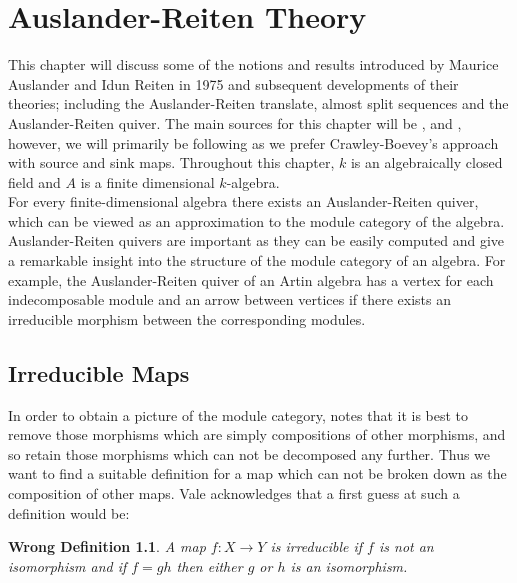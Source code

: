 \documentclass[11.5pt, twoside, a4paper, titlepage]{report}
\theoremstyle{definition}
\theoremstyle{plain}
\newtheorem*{wrong}{Wrong Definition}
\begin{document}


\chapter{Auslander-Reiten Theory}
This chapter will discuss some of the notions and results introduced by Maurice Auslander and Idun Reiten in 1975 and subsequent developments of their theories; including the Auslander-Reiten translate, almost split sequences and the Auslander-Reiten quiver. The main sources for this chapter will be \cite{CB3}, \cite{Vale} and \cite{Assem}, however, we will primarily be following \cite{CB3} as we prefer Crawley-Boevey's approach with source and sink maps. Throughout this chapter, $k$ is an algebraically closed field and $A$ is a finite dimensional $k$-algebra.\\
For every finite-dimensional algebra there exists an Auslander-Reiten quiver, which can be viewed as an approximation to the module category of the algebra. Auslander-Reiten quivers are important as they can be easily computed and give a remarkable insight into the structure of the module category of an algebra. For example, the Auslander-Reiten quiver of an Artin algebra has a vertex for each indecomposable module and an arrow between vertices if there exists an irreducible morphism between the corresponding modules. \cite{AR}

\section{Irreducible Maps}
In order to obtain a picture of the module category, \cite{Vale} notes that it is best to remove those morphisms which are simply compositions of other morphisms, and so retain those morphisms which can not be decomposed any further. Thus we want to find a suitable definition for a map which can not be broken down as the composition of other maps. Vale acknowledges that a first guess at such a definition would be:

\begin{wrong}
A map $f: X \to Y$ is \emph{irreducible} if $f$ is not an isomorphism and if $f=gh$ then either $g$ or $h$ is an isomorphism.
\end{wrong}
\end{document}
